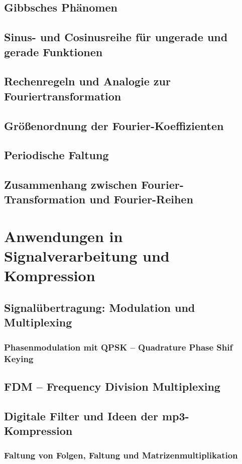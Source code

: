 \subsection{Gibbsches Phänomen}
\subsection{Sinus- und Cosinusreihe für ungerade und gerade Funktionen}
\subsection{Rechenregeln und Analogie zur Fouriertransformation}
\subsection{Größenordnung der Fourier-Koeffizienten}
\subsection{Periodische Faltung}
\subsection{Zusammenhang zwischen Fourier-Transformation und Fourier-Reihen}
\section{Anwendungen in Signalverarbeitung und Kompression}
\subsection{Signalübertragung: Modulation und Multiplexing}
\subsubsection{Phasenmodulation mit QPSK – Quadrature Phase Shif Keying}
\subsection{FDM – Frequency Division Multiplexing}
\subsection{Digitale Filter und Ideen der mp3-Kompression}
\subsubsection{Faltung von Folgen, Faltung und Matrizenmultiplikation}
